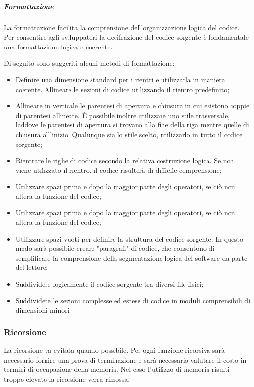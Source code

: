 \subparagraph{Formattazione}
La formattazione facilita la comprensione dell'organizzazione logica del codice. Per consentire agli sviluppatori la decifrazione del codice sorgente è fondamentale una formattazione logica e coerente.

Di seguito sono suggeriti alcuni metodi di formattazione:
\begin{itemize}
\item
Definire una dimensione standard per i rientri e utilizzarla in maniera coerente. Allineare le sezioni di codice utilizzando il rientro predefinito;
\item
Allineare in verticale le parentesi di apertura e chiusura in cui esistono coppie di parentesi allineate. È possibile inoltre utilizzare uno stile trasversale, laddove le parentesi di apertura si trovano alla fine della riga mentre quelle di chiusura all'inizio. Qualunque sia lo stile scelto, utilizzarlo in tutto il codice sorgente;
\item
Rientrare le righe di codice secondo la relativa costruzione logica. Se non viene utilizzato il rientro, il codice risulterà di difficile comprensione;
\item
Utilizzare spazi prima e dopo la maggior parte degli operatori, se ciò non altera la funzione del codice;
\item
Utilizzare spazi prima e dopo la maggior parte degli operatori, se ciò non altera la funzione del codice;
\item
Utilizzare spazi vuoti per definire la struttura del codice sorgente. In questo modo sarà possibile creare "paragrafi" di codice, che consentono di semplificare la comprensione della segmentazione logica del software da parte del lettore;
\item
Suddividere logicamente il codice sorgente tra diversi file fisici;
\item
Suddividere le sezioni complesse ed estese di codice in moduli comprensibili di dimensioni minori.
\end{itemize}

\subsubsection{Ricorsione}
La ricorsione va evitata quando possibile. Per ogni funzione ricorsiva sarà necessario fornire una prova di terminazione e sarà necessario valutare il costo in termini di occupazione della memoria. Nel caso l'utilizzo di memoria risulti troppo elevato la ricorsione verrà rimossa.


